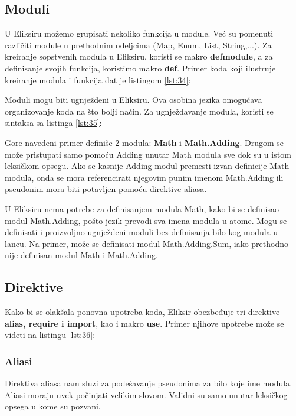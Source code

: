 \documentclass[12pt,oneside]{memoir}
\begin{document}
\newpage

\subsection{Moduli}

U Eliksiru možemo grupisati nekoliko funkcija u module. Već su pomenuti različiti module u prethodnim odeljcima (Map, Enum, List, String,...). Za kreiranje sopstvenih modula u Eliksiru, koristi se  makro \textbf{defmodule}, a za definisanje svojih funkcija, koristimo makro \textbf{def}. Primer koda koji ilustruje kreiranje modula i funkcija dat je listingom \ref{lst:34}:



Moduli mogu biti ugnježdeni u Eliksiru. Ova osobina jezika omogućava organizovanje koda na što bolji način. Za ugnježdavanje modula, koristi se sintaksa sa listinga \ref{lst:35}:



Gore navedeni primer definiše 2 modula: \textbf{Math} i \textbf{Math.Adding}. Drugom se može pristupati samo pomoću Adding unutar Math modula sve dok su u istom leksičkom opsegu. Ako se kasnije Adding modul premesti izvan definicije Math modula, onda se mora referencirati njegovim punim imenom Math.Adding ili pseudonim mora biti potavljen pomoću direktive aliasa.

U Eliksiru nema potrebe za definisanjem modula Math, kako bi se definisao modul Math.Adding, pošto jezik prevodi sva imena modula u atome. Mogu se  definisati i proizvoljno ugnježdeni moduli bez definisanja bilo kog modula u lancu. Na primer, može se definisati modul Math.Adding.Sum, iako  prethodno nije definisan modul Math i Math.Adding.

\subsection{Direktive}

Kako bi se olakšala ponovna upotreba koda, Eliksir obezbeđuje tri direktive - \textbf{alias, require i import}, kao i makro \textbf{use}. Primer njihove upotrebe može se videti na listingu \ref{lst:36}:



\subsubsection{Aliasi}
Direktiva aliasa nam sluzi za podešavanje pseudonima za bilo koje ime modula. Aliasi moraju uvek počinjati velikim slovom. Validni su samo unutar leksičkog opsega u kome su pozvani.
\end{document}
